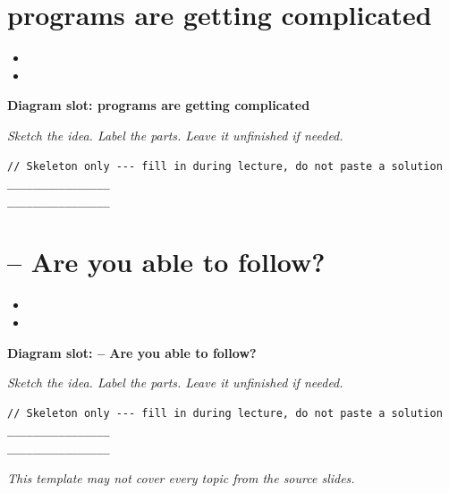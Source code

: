 \documentclass[11pt]{article}
\begin{document}
\section{programs are getting complicated}
\begin{itemize}[leftmargin=*]
  \item \hrulefill
  \vspace{2.4em}
  \item \hrulefill
  \vspace{2.4em}
\end{itemize}
\noindent\textbf{Diagram slot: programs are getting complicated}
\begin{framed}
\begin{minipage}[t][0.22\textheight]{\textwidth}
\vspace{0.4em}
\textit{Sketch the idea. Label the parts. Leave it unfinished if needed.}
\end{minipage}
\end{framed}
\vspace{1em}
\begin{lstlisting}
// Skeleton only --- fill in during lecture, do not paste a solution
________________
________________
\end{lstlisting}
\vspace{1em}
\section{– Are you able to follow?}
\begin{itemize}[leftmargin=*]
  \item \hrulefill
  \vspace{2.4em}
  \item \hrulefill
  \vspace{2.4em}
\end{itemize}
\noindent\textbf{Diagram slot: – Are you able to follow?}
\begin{framed}
\begin{minipage}[t][0.22\textheight]{\textwidth}
\vspace{0.4em}
\textit{Sketch the idea. Label the parts. Leave it unfinished if needed.}
\end{minipage}
\end{framed}
\vspace{1em}
\begin{lstlisting}
// Skeleton only --- fill in during lecture, do not paste a solution
________________
________________
\end{lstlisting}
\vspace{1em}
\vspace{2em}
\begin{center}
\textit{This template may not cover every topic from the source slides.}
\end{center}
\end{document}

